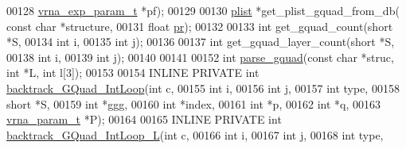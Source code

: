 \begin{DoxyCode}
00128                                       \hyperlink{group__energy__parameters_structvrna__exp__param__s}{vrna\_exp\_param\_t} *pf);
00129 
00130 \hyperlink{group__data__structures_structvrna__plist__s}{plist}       *get\_plist\_gquad\_from\_db( \textcolor{keyword}{const} \textcolor{keywordtype}{char} *structure,
00131                                       \textcolor{keywordtype}{float} \hyperlink{fold__vars_8h_ac98ec419070aee6831b44e5c700f090f}{pr});
00132 
00133 \textcolor{keywordtype}{int}         get\_gquad\_count(\textcolor{keywordtype}{short} *S,
00134                             \textcolor{keywordtype}{int} i,
00135                             \textcolor{keywordtype}{int} j);
00136 
00137 \textcolor{keywordtype}{int}         get\_gquad\_layer\_count(\textcolor{keywordtype}{short} *S,
00138                             \textcolor{keywordtype}{int} i,
00139                             \textcolor{keywordtype}{int} j);
00140 
00141 
00152 \textcolor{keywordtype}{int}         \hyperlink{group__gquads_gae41763215b9c64d2a7b67f0df8a28078}{parse\_gquad}(\textcolor{keyword}{const} \textcolor{keywordtype}{char} *struc, \textcolor{keywordtype}{int} *L, \textcolor{keywordtype}{int} l[3]);
00153 
00154 INLINE  PRIVATE \textcolor{keywordtype}{int} \hyperlink{group__gquads_ga220c41e8dbcee940ac975b8ce88e55c5}{backtrack\_GQuad\_IntLoop}(\textcolor{keywordtype}{int} c,
00155                                             \textcolor{keywordtype}{int} i,
00156                                             \textcolor{keywordtype}{int} j,
00157                                             \textcolor{keywordtype}{int} type,
00158                                             \textcolor{keywordtype}{short} *S,
00159                                             \textcolor{keywordtype}{int} *ggg,
00160                                             \textcolor{keywordtype}{int} *index,
00161                                             \textcolor{keywordtype}{int} *p,
00162                                             \textcolor{keywordtype}{int} *q,
00163                                             \hyperlink{group__energy__parameters_structvrna__param__s}{vrna\_param\_t} *P);
00164 
00165 INLINE  PRIVATE \textcolor{keywordtype}{int} \hyperlink{group__gquads_ga7b371308fa5a45c7ac353ef6ed1014de}{backtrack\_GQuad\_IntLoop\_L}(\textcolor{keywordtype}{int} c,
00166                                               \textcolor{keywordtype}{int} i,
00167                                               \textcolor{keywordtype}{int} j,
00168                                               \textcolor{keywordtype}{int} type,

\end{DoxyCode}
